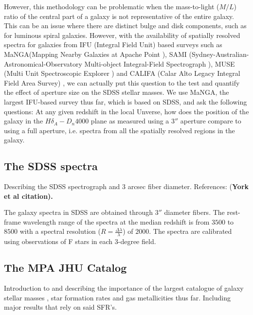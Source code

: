 However, this methodology can be problematic when the mass-to-light ($M/L$) ratio of the central part of a galaxy is not representative of the entire galaxy. This can be an issue where there are distinct bulge and disk components, such as for luminous spiral galaxies. However, with the availability of spatially resolved spectra for galaxies from IFU (Integral Field Unit) based surveys such as MaNGA(Mapping Nearby Galaxies at Apache Point \citep{bundy_overview_2014}), SAMI (Sydney-Australian-Astronomical-Observatory Multi-object Integral-Field Spectrograph \citep{bryant_sami_2015}), MUSE (Multi Unit Spectroscopic Explorer \citep{bacon_muse_2015}) and CALIFA (Calar Alto Legacy Integral Field Area Survey) \citep{sanchez_califa_2012}, we can actually put this question to the test and quantify the effect of aperture size on the SDSS stellar masses. We use MaNGA, the largest IFU-based survey thus far, which is based on SDSS, and ask the following questions: At any given redshift in the local Unverse, how does the position of the galaxy in the $H\delta_{A}-D_{n}4000$ plane as measured using a $3''$ aperture compare to using a full aperture, i.e. spectra from all the spatially resolved regions in the galaxy.\\ 

\subsection{The SDSS spectra}
Describing the SDSS spectrograph and $3$ arcsec fiber diameter. References: \citep{smee_multi-object_2013} (\bf York et al citation).

The galaxy spectra in SDSS are obtained through $3''$ diameter fibers. The rest-frame wavelength range of the spectra at the median redshift is from $3500$ to $8500$ with a spectral resolution ($R = \frac{\Delta \lambda}{\lambda}$) of $ 2000$. The spectra are calibrated using observations of F stars in each 3-degree field.

\subsection{The MPA JHU Catalog}
Introduction to and describing the importance of the largest catalogue of galaxy stellar masses \citep{kauffmann_stellar_2003}, star formation rates \citep{brinchmann_physical_2004} and gas metallicities \citep{tremonti_origin_2004} thus far. Including major results that rely on said SFR's.

